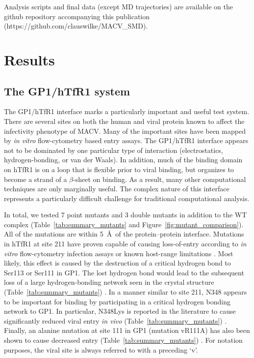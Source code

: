 \documentclass[12pt]{article}
\begin{document}
Analysis scripts and final data (except MD trajectories) are available on the github repository accompanying this publication (https://github.com/clauswilke/MACV\_SMD).

\section{Results}

\subsection{The GP1/hTfR1 system}
The GP1/hTfR1 interface marks a particularly important and useful test system. There are several sites on both the human and viral protein known to affect the infectivity phenotype of MACV. Many of the important sites have been mapped by \textit{in vitro} flow-cytometry based entry assays. The GP1/hTfR1 interface appears not to be dominated by one particular type of interaction (electrostatics, hydrogen-bonding, or van der Waals). In addition, much of the binding domain on hTfR1 is on a loop that is flexible prior to viral binding, but organizes to become a strand of a $\beta$-sheet on binding. As a result,  many other computational techniques \citep{Grant2011,Kortemme2004} are only marginally useful. The complex nature of this interface represents a particularly difficult challenge for traditional computational analysis. 

In total, we tested 7 point mutants and 3 double mutants in addition to the WT complex (Table~\ref{tab:summary_mutants} and Figure~\ref{fig:mutant_comparison}). All of the mutations are within 5~\AA\ of the protein--protein interface. Mutations in hTfR1 at site 211 have proven capable of causing loss-of-entry according to \textit{in vitro} flow-cytometry infection assays or known host-range limitations \citep{Rad2008,Rad20111,Rad20112}. Most likely, this effect is caused by the destruction of a critical hydrogen bond to Ser113 or Ser111 in GP1. The lost hydrogen bond would lead to the subsequent loss of a large hydrogen-bonding network seen in the crystal structure (Table~\ref{tab:summary_mutants}) \citep{Abraham2010}. In a manner similar to site 211, N348 appears to be important for binding by participating in a critical hydrogen bonding network \citep{Rad2008,Abraham2010} to GP1. In particular, N348Lys is reported in the literature to cause significantly reduced viral entry \textit{in vivo} (Table~\ref{tab:summary_mutants}) \citep{Rad2008,Abraham2010}. Finally, an alanine mutation at site 111 in GP1 (mutation vR111A) has also been shown to cause decreased entry (Table~\ref{tab:summary_mutants}) \citep{Rad20112}. For notation purposes, the viral site is always referred to with a preceding `v'.  
\end{document}

